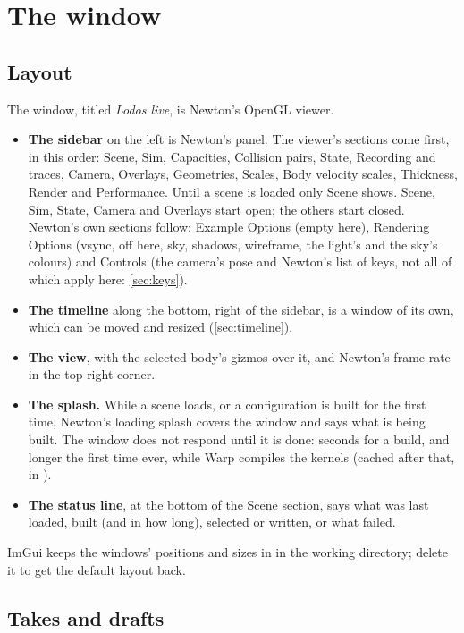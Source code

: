 \section{The window}\label{sec:window}

\subsection{Layout}\label{sec:layout}

The window, titled \emph{Lodos live}, is Newton's OpenGL viewer.

\begin{itemize}
\item \textbf{The sidebar} on the left is Newton's panel. The viewer's sections come first, in this order: Scene, Sim, Capacities, Collision pairs, State, Recording and traces, Camera, Overlays, Geometries, Scales, Body velocity scales, Thickness, Render and Performance. Until a scene is loaded only Scene shows. Scene, Sim, State, Camera and Overlays start open; the others start closed. Newton's own sections follow: Example Options (empty here), Rendering Options (vsync, off here, sky, shadows, wireframe, the light's and the sky's colours) and Controls (the camera's pose and Newton's list of keys, not all of which apply here: \cref{sec:keys}).
\item \textbf{The timeline} along the bottom, right of the sidebar, is a window of its own, which can be moved and resized (\cref{sec:timeline}).
\item \textbf{The view}, with the selected body's gizmos over it, and Newton's frame rate in the top right corner.
\item \textbf{The splash.} While a scene loads, or a configuration is built for the first time, Newton's loading splash covers the window and says what is being built. The window does not respond until it is done: seconds for a build, and longer the first time ever, while Warp compiles the kernels (cached after that, in ).
\item \textbf{The status line}, at the bottom of the Scene section, says what was last loaded, built (and in how long), selected or written, or what failed.
\end{itemize}

ImGui keeps the windows' positions and sizes in  in the working directory; delete it to get the default layout back.

\subsection{Takes and drafts}\label{sec:takes}

